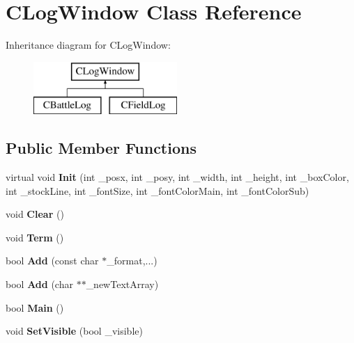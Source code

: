 \hypertarget{class_c_log_window}{}\section{C\+Log\+Window Class Reference}
\label{class_c_log_window}
Inheritance diagram for C\+Log\+Window\+:\begin{figure}[H]
\begin{center}
\leavevmode
\includegraphics[height=2.000000cm]{class_c_log_window}
\end{center}
\end{figure}
\subsection*{Public Member Functions}
\begin{DoxyCompactItemize}
\item 
virtual void {\bfseries Init} (int \+\_\+posx, int \+\_\+posy, int \+\_\+width, int \+\_\+height, int \+\_\+box\+Color, int \+\_\+stock\+Line, int \+\_\+font\+Size, int \+\_\+font\+Color\+Main, int \+\_\+font\+Color\+Sub)\hypertarget{class_c_log_window_a0b6d6ccdd24a98ab6e3f8e81e8ce657f}{}\label{class_c_log_window_a0b6d6ccdd24a98ab6e3f8e81e8ce657f}

\item 
void {\bfseries Clear} ()\hypertarget{class_c_log_window_ae01f51f5e163ba75699fa939ad0a8671}{}\label{class_c_log_window_ae01f51f5e163ba75699fa939ad0a8671}

\item 
void {\bfseries Term} ()\hypertarget{class_c_log_window_a17c0b89a15894edd9e6d919a3905ea60}{}\label{class_c_log_window_a17c0b89a15894edd9e6d919a3905ea60}

\item 
bool {\bfseries Add} (const char $\ast$\+\_\+format,...)\hypertarget{class_c_log_window_afc806191594ec4c93ac347a27d7e21c2}{}\label{class_c_log_window_afc806191594ec4c93ac347a27d7e21c2}

\item 
bool {\bfseries Add} (char $\ast$$\ast$\+\_\+new\+Text\+Array)\hypertarget{class_c_log_window_a5f8775f3bd9c29b381c97ac56c11380c}{}\label{class_c_log_window_a5f8775f3bd9c29b381c97ac56c11380c}

\item 
bool {\bfseries Main} ()\hypertarget{class_c_log_window_acb4cc76ab066eb3b6c681d3f540b36ba}{}\label{class_c_log_window_acb4cc76ab066eb3b6c681d3f540b36ba}

\item 
void {\bfseries Set\+Visible} (bool \+\_\+visible)\hypertarget{class_c_log_window_a4bb269245a2cfdfe05b2e4fdc7e9822d}{}\label{class_c_log_window_a4bb269245a2cfdfe05b2e4fdc7e9822d}

\end{DoxyCompactItemize}
